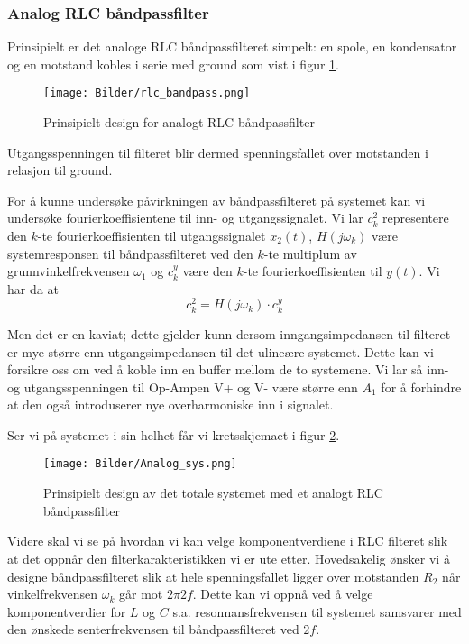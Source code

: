 \subsubsection{Analog RLC båndpassfilter}
Prinsipielt er det analoge RLC båndpassfilteret simpelt: en spole, en kondensator og en motstand kobles i serie med ground
som vist i figur \ref{fig:rlc_idea}.

\begin{figure}[H]
    \centering
    \texttt{[image: Bilder/rlc\_bandpass.png]}
    \caption{Prinsipielt design for analogt RLC båndpassfilter}
    \label{fig:rlc_idea}
\end{figure}

Utgangsspenningen til filteret blir dermed spenningsfallet over 
motstanden i relasjon til ground. 

For å kunne undersøke påvirkningen av båndpassfilteret på systemet kan 
vi undersøke fourierkoeffisientene til inn- og utgangssignalet.
Vi lar $c_k^2$ representere den $k$-te fourierkoeffisienten til 
utgangssignalet $x_2(t)$, $H(j\omega_k)$ være 
systemresponsen til båndpassfilteret ved den $k$-te multiplum av grunnvinkelfrekvensen
$\omega_1$ og $c_k^y$ være den $k$-te fourierkoeffisienten til $y(t)$. Vi har da at
\[
    c_k^2 = H(j\omega_k) \cdot c_k^y
\]

Men det er en kaviat; dette gjelder kunn dersom inngangsimpedansen til filteret er mye større enn utgangsimpedansen til det ulineære systemet.
Dette kan vi forsikre oss om ved å koble inn en buffer mellom de to systemene.
Vi lar så inn- og utgangsspenningen til Op-Ampen V+ og V- være større enn $A_1$ for å 
forhindre at den også introduserer nye overharmoniske inn i signalet.

Ser vi på systemet i sin helhet får vi kretsskjemaet i figur \ref{fig:anal_rlc_sys}.
\begin{figure}[H]
    \centering
    \texttt{[image: Bilder/Analog\_sys.png]}
    \caption{Prinsipielt design av det totale systemet med et analogt RLC båndpassfilter}
    \label{fig:anal_rlc_sys}
\end{figure}

Videre skal vi se på hvordan vi kan velge komponentverdiene i RLC filteret slik at det oppnår den 
filterkarakteristikken vi er ute etter. Hovedsakelig ønsker vi å designe båndpassfilteret slik at 
hele spenningsfallet ligger over motstanden $R_2$ når vinkelfrekvensen $\omega_k$ går mot $2\pi 2f$. 
Dette kan vi oppnå ved å velge komponentverdier for $L$ og $C$ s.a. resonnansfrekvensen til systemet 
samsvarer med den ønskede senterfrekvensen til båndpassfilteret ved $2f$.

